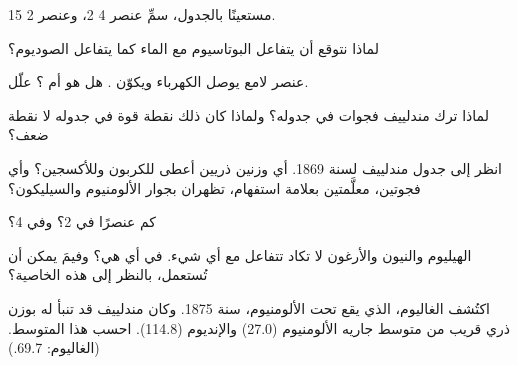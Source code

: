 \begin{exercise}[$\star\star$]\label{exo:g9:periodic-table-first-look:5}
مستعينًا بالجدول، سمِّ عنصر  4  2، وعنصر  2
 15.
\end{exercise}

\begin{exercise}[$\star\star$]\label{exo:g9:periodic-table-first-look:6}
لماذا نتوقع أن يتفاعل البوتاسيوم مع الماء كما يتفاعل الصوديوم؟
\end{exercise}

\begin{exercise}[$\star\star$]\label{exo:g9:periodic-table-first-look:7}
عنصر لامع يوصل الكهرباء ويكوّن  . هل هو  أم
؟ علّل.
\end{exercise}

\begin{exercise}[$\star\star$]\label{exo:g9:periodic-table-first-look:8}
لماذا ترك مندلييف فجوات في جدوله؟ ولماذا كان ذلك نقطة قوة في جدوله لا نقطة
ضعف؟
\end{exercise}

\begin{exercise}[$\star\star$]\label{exo:g9:periodic-table-first-look:9}
انظر إلى جدول مندلييف لسنة 1869. أي وزنين ذريين أعطى للكربون وللأكسجين؟
وأي فجوتين، معلَّمتين بعلامة استفهام، تظهران بجوار الألومنيوم
والسيليكون؟
\end{exercise}

\begin{exercise}[$\star\star$]\label{exo:g9:periodic-table-first-look:10}
كم عنصرًا في  2؟ وفي  4؟
\end{exercise}

\begin{exercise}[$\star\star\star$]\label{exo:g9:periodic-table-first-look:11}
الهيليوم والنيون والأرغون لا تكاد تتفاعل مع أي شيء. في أي  هي؟ وفيمَ
يمكن أن تُستعمل، بالنظر إلى هذه الخاصية؟
\end{exercise}

\begin{exercise}[$\star\star\star$]\label{exo:g9:periodic-table-first-look:12}
اكتُشف الغاليوم، الذي يقع تحت الألومنيوم، سنة 1875. وكان مندلييف قد تنبأ له
بوزن ذري قريب من متوسط جاريه الألومنيوم (27.0) والإنديوم (114.8). احسب
هذا المتوسط. (الغاليوم: 69.7.)
\end{exercise}

